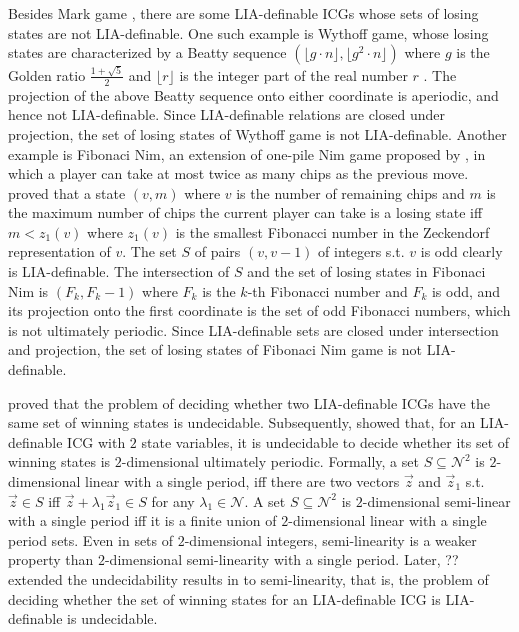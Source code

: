 \documentclass[review]{elsarticle}
\newcommand{\intNum}{\mathcal{N}}
\newcommand{\largestInt}[1][]{\lfloor#1\rfloor}
\begin{document}
Besides Mark game \cite{Kru2009}, there are some LIA-definable ICGs whose sets of losing states are not LIA-definable.
One such example is Wythoff game, whose losing states are characterized by a Beatty sequence $(\largestInt[g \cdot n], \largestInt[g^2 \cdot n])$ where $g$ is the Golden ratio $\frac{1 + \sqrt{5}}{2}$ and $\largestInt[r]$ is the integer part of the real number $r$ \cite{Ray1894,Bea1926}.
The projection of the above Beatty sequence onto either coordinate is aperiodic, and hence not LIA-definable.
Since LIA-definable relations are closed under projection, the set of losing states of Wythoff game is not LIA-definable.
Another example is Fibonaci Nim, an extension of one-pile Nim game proposed by \citet{Whi1963}, in which a player can take at most twice as many chips as the previous move.
\citet{Whi1963} proved that a state $(v, m)$ where $v$ is the number of remaining chips and $m$ is the maximum number of chips the current player can take is a losing state iff $m < z_1(v)$ where $z_1(v)$ is the smallest Fibonacci number in the Zeckendorf representation \cite{Zec1972} of $v$.
The set $S$ of pairs $(v, v - 1)$ of integers s.t. $v$ is odd clearly is LIA-definable.
The intersection of $S$ and the set of losing states in Fibonaci Nim is $(F_k, F_k - 1)$ where $F_k$ is the $k$-th Fibonacci number and $F_k$ is odd, and its projection onto the first coordinate is the set of odd Fibonacci numbers, which is not ultimately periodic.
Since LIA-definable sets are closed under intersection and projection, the set of losing states of Fibonaci Nim game is not LIA-definable.

\citet{LarW2013} proved that the problem of deciding whether two LIA-definable ICGs have the same set of winning states is undecidable.	
Subsequently, \citet{Lar2013} showed that, for an LIA-definable ICG with $2$ state variables, it is undecidable to decide whether its set of winning states is $2$-dimensional ultimately periodic.
Formally, a set $S \subseteq \intNum^2$ is $2$-dimensional linear with a single period, iff there are two vectors $\vec{z}$ and $\vec{z}_1$ s.t. $\vec{z} \in S$ iff $\vec{z} + \lambda_1 \vec{z}_1 \in S$ for any $\lambda_1 \in \intNum$.
A set $S \subseteq \intNum^2$ is $2$-dimensional semi-linear with a single period iff it is a finite union of $2$-dimensional linear with a single period sets.
Even in sets of $2$-dimensional integers, semi-linearity is a weaker property than $2$-dimensional semi-linearity with a single period. 
Later, ?? extended the undecidability results in \citet{Lar2013} to semi-linearity, that is, the problem of deciding whether the set of winning states for an LIA-definable ICG is LIA-definable is undecidable.
\end{document}
